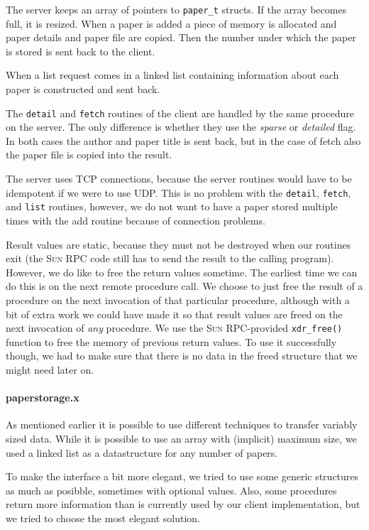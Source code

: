 \documentclass[a4paper,10pt]{article}
\begin{document}
The server keeps an array of pointers to \texttt{paper\_t} structs. If the
array becomes full, it is resized. When a paper is added a piece of
memory is allocated and paper details and paper file are copied. Then
the number under which the paper is stored is sent back to the
client.

When a list request comes in a linked list containing information
about each paper is constructed and sent back.

The \texttt{detail} and \texttt{fetch} routines of the client are handled by the same
procedure on the server. The only difference is whether they use the
\emph{sparse} or \emph{detailed} flag. In both cases the author and
paper title is sent back, but in the case of fetch also the paper file
is copied into the result.

The server uses TCP connections, because the server routines would
have to be idempotent if we were to use UDP. This is no problem with
the \texttt{detail}, \texttt{fetch}, and \texttt{list} routines, however, we do not want to have
a paper stored multiple times with the add routine because of
connection problems.

Result values are static, because they must not be destroyed when our
routines exit (the \textsc{Sun RPC} code still has to send the result
to the calling program). However, we do like to free the return values
sometime. The earliest time we can do this is on the next remote
procedure call.
We choose to just free the result of a procedure on the next invocation
of that particular procedure, although with a bit of extra work we could
have made it so that result values are freed on the next invocation of
\emph{any} procedure.
We use the \textsc{Sun RPC}-provided \texttt{xdr\_free()} function to
free the memory of previous return values. To use it successfully
though, we had to make sure that there is no data in the freed
structure that we might need later on.

\paragraph{paperstorage.x}
As mentioned earlier it is possible to use different techniques to
transfer variably sized data. While it is possible to use an array
with (implicit) maximum size, we used a linked list as a datastructure
for any number of papers.

To make the interface a bit more elegant, we tried to use some generic
structures as much as posibble, sometimes with optional values. Also,
some procedures return more information than is currently used by our
client implementation, but we tried to choose the most elegant
solution.
\end{document}
